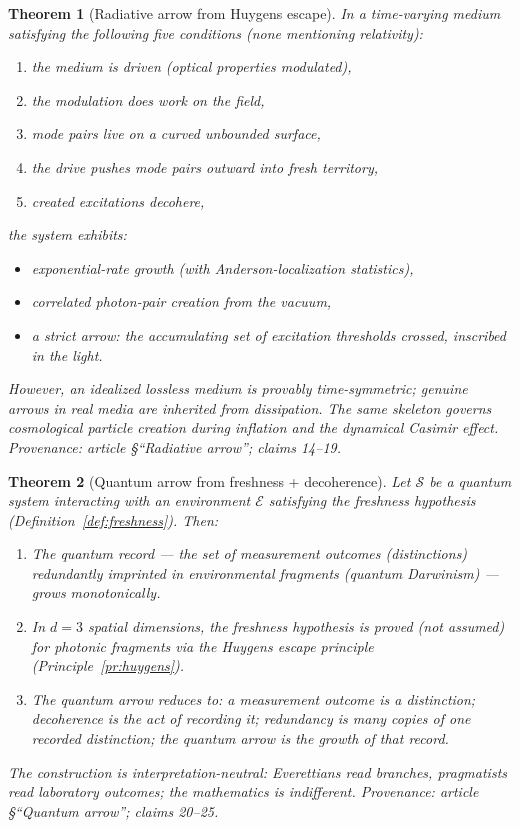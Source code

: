 \documentclass[11pt]{article}
\newtheorem{theorem}{Theorem}
\newcommand{\cE}{\mathcal{E}}
\newcommand{\cS}{\mathcal{S}}
\begin{document}
\begin{theorem}[Radiative arrow from Huygens escape]\label{thm:radiative}
In a time-varying medium satisfying the following five conditions (none
mentioning relativity):
\begin{enumerate}
  \item the medium is driven (optical properties modulated),
  \item the modulation does work on the field,
  \item mode pairs live on a curved unbounded surface,
  \item the drive pushes mode pairs outward into fresh territory,
  \item created excitations decohere,
\end{enumerate}
the system exhibits:
\begin{itemize}
  \item exponential-rate growth (with Anderson-localization statistics),
  \item correlated photon-pair creation from the vacuum,
  \item a strict arrow: the accumulating set of excitation thresholds crossed,
    inscribed in the light.
\end{itemize}
However, an idealized lossless medium is provably time-symmetric; genuine
arrows in real media are inherited from dissipation.  The same skeleton
governs cosmological particle creation during inflation and the dynamical
Casimir effect.
\emph{Provenance: article \S``Radiative arrow''; claims 14--19.}
\end{theorem}

\begin{theorem}[Quantum arrow from freshness + decoherence]\label{thm:quantum}
Let $\cS$ be a quantum system interacting with an environment $\cE$
satisfying the freshness hypothesis (Definition~\ref{def:freshness}).  Then:
\begin{enumerate}
  \item The quantum record — the set of measurement outcomes (distinctions)
    redundantly imprinted in environmental fragments (quantum Darwinism) —
    grows monotonically.
  \item In $d = 3$ spatial dimensions, the freshness hypothesis is proved
    (not assumed) for photonic fragments via the Huygens escape principle
    (Principle~\ref{pr:huygens}).
  \item The quantum arrow reduces to: a measurement outcome is a distinction;
    decoherence is the act of recording it; redundancy is many copies of one
    recorded distinction; the quantum arrow is the growth of that record.
\end{enumerate}
The construction is interpretation-neutral: Everettians read branches,
pragmatists read laboratory outcomes; the mathematics is indifferent.
\emph{Provenance: article \S``Quantum arrow''; claims 20--25.}
\end{theorem}
\end{document}
